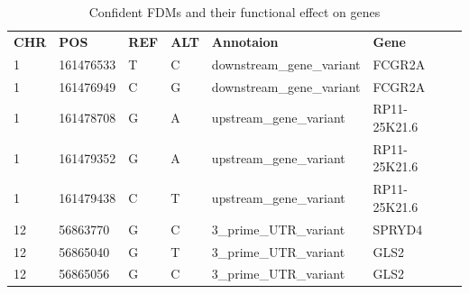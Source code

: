 \begin{table}[]
\begin{tabular}{llllllll}
\textbf{CHR} & \textbf{POS} & \textbf{REF} & \textbf{ALT} & \textbf{Annotaion}  & \textbf{Gene}  \\
1  & 161476533 & T & C & downstream\_gene\_variant &  FCGR2A \\
1  & 161476949 & C & G & downstream\_gene\_variant & FCGR2A \\
1  & 161478708 & G & A & upstream\_gene\_variant   & RP11-25K21.6 \\
1  & 161479352 & G & A & upstream\_gene\_variant   & RP11-25K21.6 \\
1  & 161479438 & C & T & upstream\_gene\_variant   & RP11-25K21.6 \\
12 & 56863770  & G & C & 3\_prime\_UTR\_variant    & SPRYD4 \\
12 & 56865040  & G & T & 3\_prime\_UTR\_variant    & GLS2 \\
12 & 56865056  & G & C & 3\_prime\_UTR\_variant    & GLS2 
\end{tabular}
\caption{Confident FDMs and their functional effect on genes}
\label{tab:4.2}
\end{table}